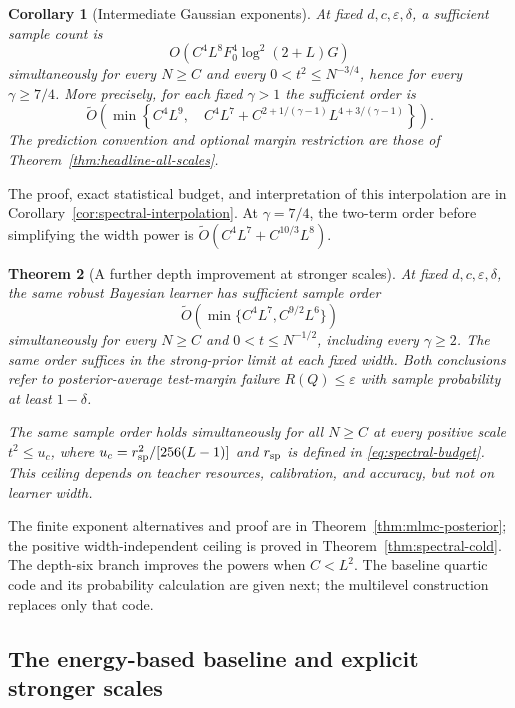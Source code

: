 \documentclass[11pt]{article}
\newtheorem{theorem}{Theorem}
\newtheorem{corollary}[theorem]{Corollary}
\begin{document}
\begin{corollary}[Intermediate Gaussian exponents]
\label{cor:headline-intermediate}
At fixed $d,c,\varepsilon,\delta$, a sufficient sample count is
\[
 O\!\left(C^4L^8F_0^4\log^2(2+L)G\right)
\]
simultaneously for every $N\ge C$ and every
$0<t^2\le N^{-3/4}$, hence for every $\gamma\ge7/4$.
More precisely, for each fixed $\gamma>1$ the sufficient order is
\[
 \widetilde O\!\left(\min\left\{
 C^4L^9,\quad
 C^4L^7+C^{2+1/(\gamma-1)}L^{4+3/(\gamma-1)}
 \right\}\right).
\]
The prediction convention and optional margin restriction are those
of Theorem~\ref{thm:headline-all-scales}.
\end{corollary}

The proof, exact statistical budget, and interpretation of this
interpolation are in Corollary~\ref{cor:spectral-interpolation}.
At $\gamma=7/4$, the two-term order before simplifying the width
power is $\widetilde O(C^4L^7+C^{10/3}L^8)$.

\begin{theorem}[A further depth improvement at stronger scales]
\label{thm:headline-mlmc}
At fixed $d,c,\varepsilon,\delta$, the same robust Bayesian learner
has sufficient sample order
\[
 \widetilde O\!\left(\min\{C^4L^7,C^{9/2}L^6\}\right)
\]
simultaneously for every $N\ge C$ and $0<t\le N^{-1/2}$,
including every $\gamma\ge2$. The same order suffices in the
strong-prior limit at each fixed width. Both conclusions refer to
posterior-average test-margin failure $R(Q)\le\varepsilon$ with
sample probability at least $1-\delta$.

The same sample order holds simultaneously for all $N\ge C$ at every
positive scale $t^2\le u_c$, where
$u_c=r_{\rm sp}^2/[256(L-1)]$ and $r_{\rm sp}$ is defined in
\eqref{eq:spectral-budget}. This ceiling depends on teacher resources,
calibration, and accuracy, but not on learner width.
\end{theorem}

The finite exponent alternatives and proof are in
Theorem~\ref{thm:mlmc-posterior}; the positive width-independent
ceiling is proved in Theorem~\ref{thm:spectral-cold}. The depth-six branch improves the
powers when $C<L^2$. The baseline quartic code and its probability
calculation are given next; the multilevel construction replaces only
that code.

\subsection{The energy-based baseline and explicit stronger scales}
\end{document}
